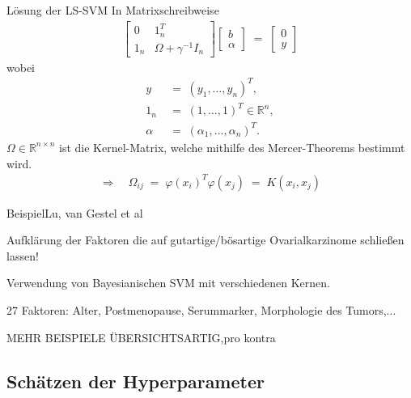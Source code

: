 \documentclass{beamer}
\begin{document}
{\begin{frame}{Lösung der LS-SVM}
	In Matrixschreibweise
	\begin{align}
		\begin{bmatrix}
			0& 1_n^T \\[0,5cm]
			1_n& \Omega+\gamma^{-1}I_n
		\end{bmatrix}
		\begin{bmatrix}
			b \\[0,2cm]
			\alpha
		\end{bmatrix}\;=\;
		\begin{bmatrix}
			0 \\[0,2cm] 
			y
		\end{bmatrix} 
	\end{align}
	wobei
	\begin{align}
		y &\;=\;(y_1,\dots,y_n)^T,\\
		1_n &\;=\;(1,\dots,1)^T\in\mathbb{R}^n,\\
		\alpha &\;=\;(\alpha_1,\dots,\alpha_n)^T.
	\end{align}
	$\Omega\in\mathbb{R}^{n\times n}$ ist die Kernel-Matrix, welche mithilfe des Mercer-Theorems bestimmt wird.
	\begin{align}
		\Rightarrow\quad\Omega_{ij} \;=\;\varphi(x_i)^T\varphi(x_j)\;=\;K(x_i,x_j)
	\end{align}
\end{frame}

\begin{frame}{Beispiel}{Lu, van Gestel et al}


Aufklärung der Faktoren die auf gutartige/bösartige Ovarialkarzinome schließen lassen!

Verwendung von Bayesianischen SVM mit verschiedenen Kernen.

27 Faktoren: Alter, Postmenopause, Serummarker, Morphologie des Tumors,...


MEHR BEISPIELE ÜBERSICHTSARTIG,pro kontra

\end{frame}




\subsection{Schätzen der Hyperparameter}

}
\end{document}
